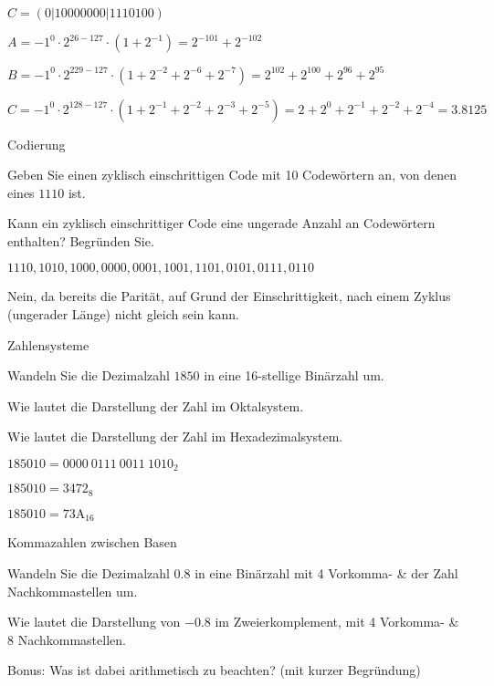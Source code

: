 \documentclass{exercisesheet}
\begin{document}
\begin{solutions}
  \item $C = (0|10000000|1110100)$
  \item
  $A = {-1}^0 \cdot 2^{26-127} \cdot (1+2^{-1}) = 2^{-101} + 2^{-102}$\par
  $B = {-1}^0 \cdot 2^{229-127} \cdot (1+2^{-2}+2^{-6}+2^{-7}) = 2^{102} + 2^{100} + 2^{96} + 2^{95}$\par
  $C = {-1}^0 \cdot 2^{128-127} \cdot (1+2^{-1}+2^{-2}+2^{-3}+2^{-5}) = 2 + 2^0 + 2^{-1} + 2^{-2} + 2^{-4} = 3.8125$
\end{solutions}

\begin{exercises}{Codierung}
\item Geben Sie einen zyklisch einschrittigen Code mit 10 Codewörtern an, von denen eines $1110$ ist.
\item Kann ein zyklisch einschrittiger Code eine ungerade Anzahl an Codewörtern enthalten? Begründen Sie.
\end{exercises}

\begin{solutions}
  \item $1110, 1010, 1000, 0000, 0001, 1001, 1101, 0101, 0111, 0110$
  \item Nein, da bereits die Parität, auf Grund der Einschrittigkeit, nach einem Zyklus (ungerader Länge) nicht gleich sein kann.
\end{solutions}

\begin{exercises}{Zahlensysteme}
\item Wandeln Sie die Dezimalzahl $1850$ in eine 16-stellige Binärzahl um.\points[4]
\item Wie lautet die Darstellung der Zahl im Oktalsystem.\points
\item Wie lautet die Darstellung der Zahl im Hexadezimalsystem.\points
\end{exercises}

\begin{solutions}
  \item $1850{10} = {0000\ 0111\ 0011\ 1010}_2$
  \item $1850{10} = {3472}_8$
  \item $1850{10} = {\mathrm{73A}}_{16}$
\end{solutions}

\begin{exercises}{Kommazahlen zwischen Basen}
\item Wandeln Sie die Dezimalzahl $0.8$ in eine Binärzahl mit 4 Vorkomma- \& der Zahl Nachkommastellen um.\points[4]
\item Wie lautet die Darstellung von $-0.8$ im Zweierkomplement, mit 4 Vorkomma- \& 8 Nachkommastellen.\points[2]
\item Bonus: Was ist dabei arithmetisch zu beachten? (mit kurzer Begründung)\points[3]
\end{exercises}
\end{document}
